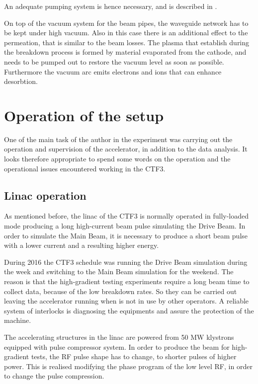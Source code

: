 An adequate pumping system is hence necessary, and is described in \cite{ctf3:dr}.

On top of the vacuum system for the beam pipes, the waveguide network has to be kept under high vacuum. Also in this case there is an additional effect to the permeation, that is similar to the beam losses. The plasma that establish during the breakdown process is formed by material evaporated from the cathode, and needs to be pumped out to restore the vacuum level as soon as possible. Furthermore the vacuum arc emits electrons and ions that can enhance desorbtion.


\section[Operation of the setup]{Operation of the setup}

One of the main task of the author in the experiment was carrying out the operation and supervision of the accelerator, in addition to the data analysis. It looks therefore appropriate to spend some words on the operation and the operational issues encountered working in the CTF3.

\subsection{Linac operation}

As mentioned before, the linac of the CTF3 is normally operated in fully-loaded mode producing a long  high-current beam pulse simulating the Drive Beam. In order to simulate the Main Beam, it is necessary to produce a short beam pulse with a lower current and a resulting higher energy. 

During 2016 the CTF3 schedule was running the Drive Beam simulation during the week and switching to the Main Beam simulation for the weekend. The reason is that the high-gradient testing experiments require a long beam time to collect data, because of the low breakdown rates. So they can be carried out leaving the accelerator running when is not in use by other operators. A reliable system of interlocks is diagnosing the equipments and assure the protection of the machine.

The accelerating structures in the linac are powered from 50 MW klystrons equipped with pulse compressor system. 
In order to produce the beam for high-gradient tests, the RF pulse shape has to change, to shorter pulses of higher power. This is realised modifying the phase program of the low level RF, in order to change the pulse compression. 

